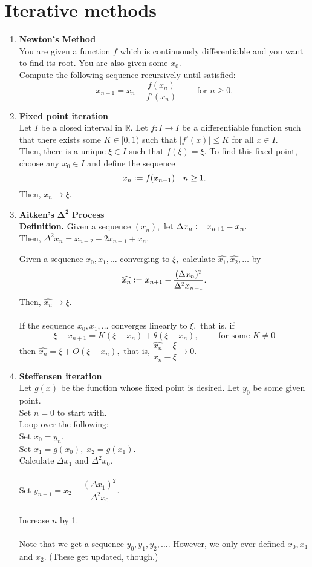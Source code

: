 \documentclass[12pt]{article}
\theoremstyle{definition}
\begin{document}
\section{Iterative methods}
\begin{enumerate} 
	\itemsep1em
	\item \textbf{Newton's Method} \\
	You are given a function $f$ which is continuously differentiable and you want to find its root. You are also given some $x_0.$\\
	Compute the following sequence recursively until satisfied:
	\[x_{n+1} = x_n - \frac{f(x_n)}{f'(x_n)} \qquad \text{ for } n \ge 0.\]
	\item \textbf{Fixed point iteration}\\
	Let $I$ be a closed interval in $\mathbb{R}.$ Let $f:I\to I$ be a differentiable function such that there exists some $K \in [0, 1)$ such that $|f'(x)| \le K$ for all $x \in I.$\\
	Then, there is a unique $\xi \in I$ such that $f(\xi) = \xi.$ To find this fixed point, choose any $x_0 \in I$ and define the sequence
	\[x_n \vcentcolon= f(x_{n-1}) \quad n \ge 1.\]
	Then, $x_n \to \xi.$
	\item \textbf{Aitken's} $\mathbf{\Delta^2}$ \textbf{Process}\\
	\textbf{Definition.} Given a sequence $(x_n),$ let $\Delta x_n \vcentcolon= x_{n+1} - x_n.$\\
	Then, $\Delta^2x_n = x_{n+2} - 2x_{n+1} + x_n.$
	
	Given a sequence $x_0, x_1, \ldots$ converging to $\xi,$ calculate $\widehat{x_1}, \widehat{x_2}, \ldots$ by
	\[\widehat{x_n} \vcentcolon= x_{n+1} - \frac{(\Delta x_n)^2}{\Delta^2x_{n-1}}.\]
	Then, $\widehat{x_n} \to \xi.$\\~\\
	If the sequence $x_0, x_1, \ldots$ converges linearly to $\xi,$ that is, if
	\[\xi - x_{n+1} = K(\xi - x_n) + \theta(\xi - x_n), \qquad \text{ for some } K \neq 0\]
	then $\widehat{x_n} = \xi + O(\xi - x_n),$ that is, $\dfrac{\widehat{x_n} - \xi}{x_n - \xi} \to 0.$
	\item \textbf{Steffensen iteration}\\
	Let $g(x)$ be the function whose fixed point is desired. Let $y_0$ be some given point.\\
	Set $n = 0$ to start with.\\
	Loop over the following:\\
	Set $x_0 = y_n.$\\
	Set $x_1 = g(x_0),\;x_2 = g(x_1).$\\
	Calculate $\Delta x_1$ and $\Delta^2x_0.$\\~\\
	Set $y_{n+1} = x_2 - \dfrac{(\Delta x_1)^2}{\Delta^2x_0}.$\\~\\
	Increase $n$ by 1.\\~\\
	Note that we get a sequence $y_0, y_1, y_2, \ldots.$ However, we only ever defined $x_0, x_1$ and $x_2.$ (These get updated, though.)
\end{enumerate}
\end{document}
